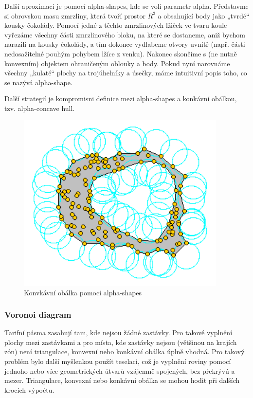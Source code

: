 Další aproximací je pomocí alpha-shapes, kde se volí parametr alpha. Představme si obrovskou masu zmrzliny,
která tvoří prostor \(R^3\) a obsahující body jako „tvrdé“ kousky čokolády. Pomocí jedné z těchto 
zmrzlinových lžiček ve tvaru koule vyřezáme všechny části zmrzlinového bloku, na které se dostaneme,
aniž bychom narazili na kousky čokolády, a tím dokonce vydlabeme otvory uvnitř 
(např. části nedosažitelné pouhým pohybem lžíce z venku). Nakonec skončíme s 
(ne nutně konvexním) objektem ohraničeným oblouky a body. Pokud nyní narovnáme všechny 
„kulaté“ plochy na trojúhelníky a úsečky, máme intuitivní popis toho, co se nazývá alpha-shape. \cite{alpha-shapes}

Další strategií je kompromisni definice mezi alpha-shapes a konkávní obálkou, tzv. alpha-concave
hull. 

\begin{figure}[H] \centering
    \includegraphics[width=296pt]{./pictures/alphashape.png}
    \caption[Konvkávní obálka pomocí alpha-shapes]{Konvkávní obálka pomocí alpha-shapes \cite{alpha-shapes-picture}}
	\label{fig:alpha-shapes-picture}              
\end{figure} 

\subsubsection{Voronoi diagram}

Tarifní pásma zasahují tam, kde nejsou žádné zastávky. Pro takové vyplnění plochy
mezi zastávkami a pro místa, kde zastávky nejsou (většinou na krajích zón) není triangulace, konvexní nebo konkávní 
obálka úplně vhodná. Pro takový problém bylo další myšlenkou použít teselaci, což je vyplnění roviny pomocí jednoho
nebo více geometrických útvarů vzájemně spojených, bez překrývú a mezer. Triangulace, konvexní nebo konkávní 
obálka se mohou hodit při dalších krocích výpočtu.

